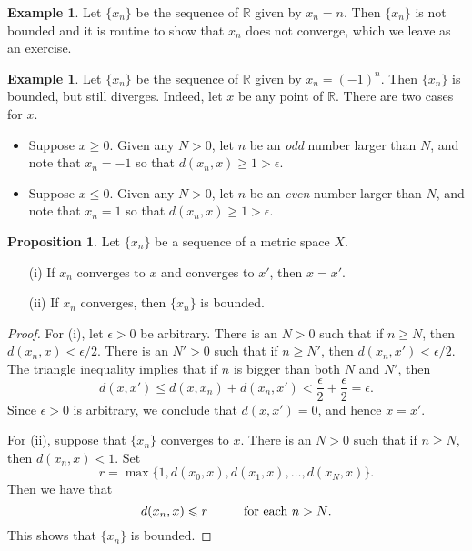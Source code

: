 \documentclass[12pt]{article}
\theoremstyle{definition}
\newtheorem{example}[definition]{Example}
\theoremstyle{theorem}
\newtheorem{proposition}[definition]{Proposition}
\begin{document}
\begin{example}
Let $\{x_n\}$ be the sequence of $\mathbb{R}$ given by $x_n = n$. Then $\{x_n\}$ is not bounded and it is routine to show that $x_n$ does not converge, which we leave as an exercise. 
\end{example}

\begin{example}
Let $\{x_n\}$ be the sequence of $\mathbb{R}$ given by $x_n = (-1)^n$. Then $\{x_n\}$ is bounded, but still diverges. Indeed, let $x$ be any point of $\mathbb{R}$. There are two cases for $x$. 
\begin{itemize}
\item Suppose $x \geqslant 0$. Given any $N > 0$, let $n$ be an \emph{odd} number larger than $N$, and note that $x_n = -1$ so that $d(x_n, x) \geqslant 1 > \epsilon$. 
\item Suppose $x \leqslant 0$. Given any $N > 0$, let $n$ be an \emph{even} number larger than $N$, and note that $x_n = 1$ so that $d(x_n, x) \geqslant 1 > \epsilon.$
\end{itemize}
\end{example}

\begin{proposition}\label{prop:sequences}
Let $\{x_n\}$ be a sequence of a metric space $X$. 
\begin{enumerate}
\item[(i)] If $x_n$ converges to $x$ and converges to $x'$, then $x = x'$. 
\item[(ii)] If $x_n$ converges, then $\{x_n\}$ is bounded. 
\end{enumerate}
\end{proposition}

\begin{proof}
For (i), let $\epsilon > 0$ be arbitrary. There is an $N > 0$ such that if $n \geqslant N$, then $d(x_n, x) < \epsilon /2$. There is an $N' > 0$ such that if $n \geqslant N'$, then $d(x_n, x') < \epsilon/2$. The triangle inequality implies that if $n$ is bigger than both $N$ and $N'$, then 
\[
d(x,x') \leqslant d(x,x_n) + d(x_n, x') < \frac{\epsilon}{2} + \frac{\epsilon}{2} = \epsilon.
\]
Since $\epsilon > 0$ is arbitrary, we conclude that $d(x,x') = 0$, and hence $x = x'$. 

For (ii), suppose that $\{x_n\}$ converges to $x$. There is an $N > 0$ such that if $n \geqslant N$, then $d(x_n, x) < 1$. Set 
\[
r = \max\{1, d(x_0, x), d(x_1, x), \ldots, d(x_N, x)\}.
\]
Then we have that 
\[
d(x_n, x) \leqslant r \hspace{10mm} \text{for each $n > N$}.
\]
This shows that $\{x_n\}$ is bounded.
\end{proof}
\end{document}
